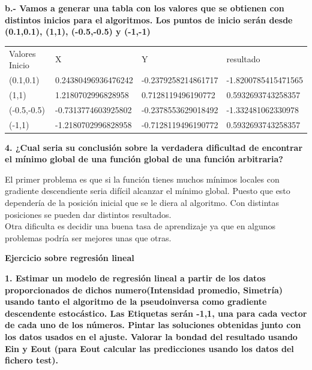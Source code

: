 \documentclass[titlepage]{article}
\begin{document}
	
	
	
\newpage

\newpage
	\textbf{b.- Vamos a generar una tabla con los valores que se obtienen con distintos inicios para el algoritmos. Los puntos de inicio serán desde (0.1,0.1), (1,1), (-0.5,-0.5) y (-1,-1)  }
	\newline
	

		\begin{center}
		\begin{tabular}{llll}
			Valores Inicio & X & Y & resultado  \\
			(0.1,0.1)   & 0.24380496936476242  & -0.2379258214861717  & -1.8200785415471565    \\
			(1,1)       & 1.2180702996828958 & 0.7128119496190772  & 0.5932693743258357   \\
			(-0.5,-0.5) & -0.7313774603925802 & -0.2378553629018492  &  -1.332481062330978  \\
			(-1,1)      & -1.2180702996828958  & -0.7128119496190772  &  0.5932693743258357 
		\end{tabular}	
		\end{center}

	
	\textbf{4. ¿Cual seria su conclusión sobre la verdadera dificultad de encontrar el mínimo global de una función global de una función arbitraria?}
	\newline
	
	El primer problema es que si la función tienes muchos mínimos locales con gradiente descendiente seria difícil alcanzar el mínimo global. Puesto que esto dependería de la posición inicial que se le diera al algoritmo. Con distintas posiciones se pueden dar distintos resultados.\\
	Otra dificulta es decidir una buena tasa de aprendizaje ya que en algunos problemas podría ser mejores unas que otras.
	
	
\newpage

\newpage
	\large
	\textbf{Ejercicio sobre regresión lineal}
	\newline
	
	\textbf{1. Estimar un modelo de regresión lineal a partir de los datos proporcionados de dichos numero(Intensidad promedio, Simetría) usando tanto el algoritmo de la pseudoinversa como gradiente descendente estocástico. Las Etiquetas serán {-1,1}, una para cada vector de cada uno de los números. Pintar las soluciones obtenidas junto con los datos usados en el ajuste. Valorar la bondad del resultado usando Ein y Eout (para Eout calcular las predicciones usando los datos del fichero test).}
	
\end{document}
